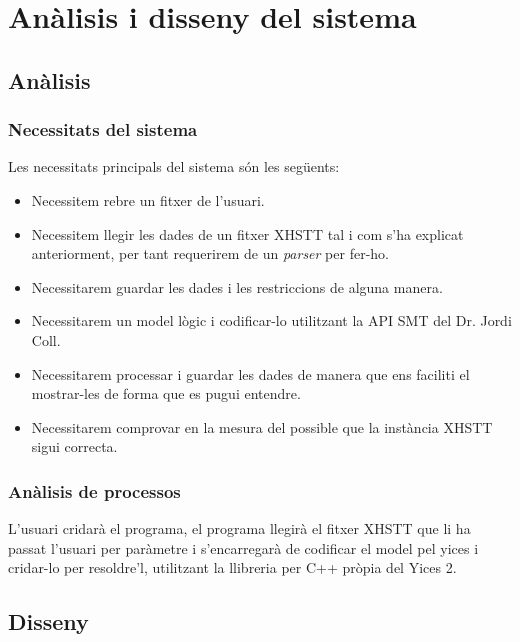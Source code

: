 \documentclass[11pt,a4paper,twoside]{report}
\begin{document}
  \chapter{Anàlisis i disseny del sistema}

  \section{Anàlisis}
  \subsection{Necessitats del sistema}
  Les necessitats principals del sistema són les següents: 
  \begin{itemize}
    \item Necessitem rebre un fitxer de l'usuari.
    \item Necessitem llegir les dades de un fitxer XHSTT tal i com s'ha explicat anteriorment, per tant requerirem de un \textit{parser} per fer-ho.
    \item Necessitarem guardar les dades i les restriccions de alguna manera.
    \item Necessitarem un model lògic i codificar-lo utilitzant la API SMT del Dr. Jordi Coll. 
    \item Necessitarem processar i guardar les dades de manera que ens faciliti el mostrar-les de forma que es pugui entendre.
    \item Necessitarem comprovar en la mesura del possible que la instància XHSTT sigui correcta.
  \end{itemize}

  \subsection{Anàlisis de processos}
  L'usuari cridarà el programa, el programa llegirà el fitxer XHSTT que li ha passat l'usuari per paràmetre i s'encarregarà de codificar el model pel yices i cridar-lo per resoldre'l, utilitzant la llibreria per C++ pròpia del Yices 2.


  
  \section{Disseny}    
\end{document}
